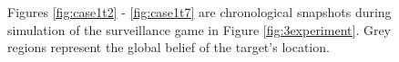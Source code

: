 \begin{figure}
\begin{minipage}{5.0cm}
{		}
		
	\end{minipage}
	
	
	\caption{Figures \ref{fig:case1t2} - \ref{fig:case1t7} are chronological snapshots during simulation of the surveillance game in Figure \ref{fig:3experiment}. Grey regions represent the global belief of the target's location.  
	}\vspace{-0.5cm}
	\label{fig:case1exp}
	
\end{figure}

